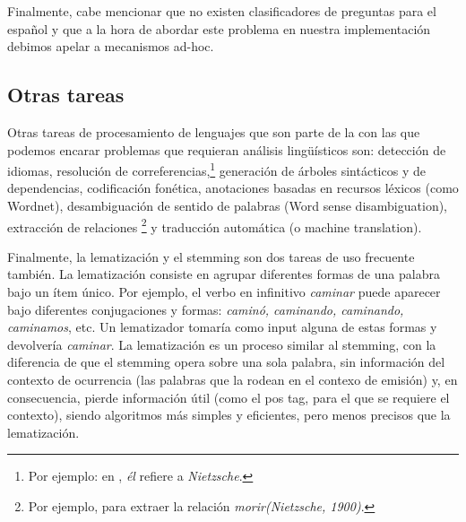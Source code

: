 Finalmente, cabe mencionar que no existen clasificadores de preguntas para el español y que a la hora de abordar este problema en nuestra implementación debimos apelar a mecanismos ad-hoc.

\subsection{Otras tareas}
\label{subsec:otras-tareas-pnl}
Otras tareas de procesamiento de lenguajes que son parte de la  con las que podemos encarar problemas que requieran análisis lingüísticos son: detección de idiomas, resolución de correferencias,\footnote{Por ejemplo: en , \textit{él} refiere a \textit{Nietzsche}.} generación de árboles sintácticos y de dependencias, codificación fonética, anotaciones basadas en recursos léxicos (como Wordnet), desambiguación de sentido de palabras (Word sense disambiguation), extracción de relaciones \footnote{Por ejemplo, para  extraer la relación \textit{morir(Nietzsche, 1900)}.} y traducción automática (o machine translation).

Finalmente, la lematización y el stemming son dos tareas de uso frecuente también. La lematización consiste en agrupar diferentes formas de una palabra bajo un ítem único. Por ejemplo, el verbo en infinitivo \textit{caminar} puede aparecer bajo diferentes conjugaciones y formas: \textit{caminó, caminando, caminando, caminamos}, etc. Un lematizador tomaría como input alguna de estas formas y devolvería \textit{caminar}. La lematización es un proceso similar al stemming, con la diferencia de que el stemming opera sobre una sola palabra, sin información del contexto de ocurrencia (las palabras que la rodean en el contexo de emisión) y, en consecuencia, pierde información útil (como el pos tag, para el que se requiere el contexto), siendo algoritmos más simples y eficientes, pero menos precisos que la lematización.